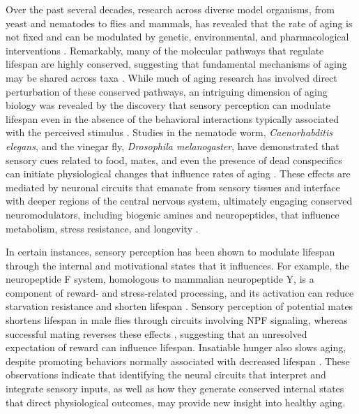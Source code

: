 Over the past several decades, research across diverse model organisms, from yeast and nematodes to flies and mammals, has revealed that the rate of aging is not fixed and can be modulated by genetic, environmental, and pharmacological interventions \citep{gems2013}. 
Remarkably, many of the molecular pathways that regulate lifespan are highly conserved, suggesting that fundamental mechanisms of aging may be shared across taxa \citep{lopez-otin2013}.
While much of aging research has involved direct perturbation of these conserved pathways, an intriguing dimension of aging biology was revealed by the discovery that sensory perception can modulate lifespan even in the absence of the behavioral interactions typically associated with the perceived stimulus \citep{pontillo2025, gendron2020, miller2020, garratt2022}. 
Studies in the nematode worm, \textit{Caenorhabditis elegans}, and the vinegar fly, \textit{Drosophila melanogaster}, have demonstrated that sensory cues related to food, mates, and even the presence of dead conspecifics can initiate physiological changes that influence rates of aging \citep{gendron2014, chakraborty2019, libert2007, hernandez-lima2025, miller2022}. 
These effects are mediated by neuronal circuits that emanate from sensory tissues and interface with deeper regions of the central nervous system, ultimately engaging conserved neuromodulators, including biogenic amines and neuropeptides, that influence metabolism, stress resistance, and longevity \citep{chakraborty2019, miller2020, miller2022}. 

In certain instances, sensory perception has been shown to modulate lifespan through the internal and motivational states that it influences. 
For example, the neuropeptide F system, homologous to mammalian neuropeptide Y, is a component of reward- and stress-related processing, and its activation can reduce starvation resistance and shorten lifespan \citep{ryvkin2024, gendron2014}.
Sensory perception of potential mates shortens lifespan in male flies through circuits involving NPF signaling, whereas successful mating reverses these effects \citep{gendron2014}, suggesting that an unresolved expectation of reward can influence lifespan. 
Insatiable hunger also slows aging, despite promoting behaviors normally associated with decreased lifespan \citep{weaver2023a}. 
These observations indicate that identifying the neural circuits that interpret and integrate sensory inputs, as well as how they generate conserved internal states that direct physiological outcomes, may provide new insight into healthy aging.

